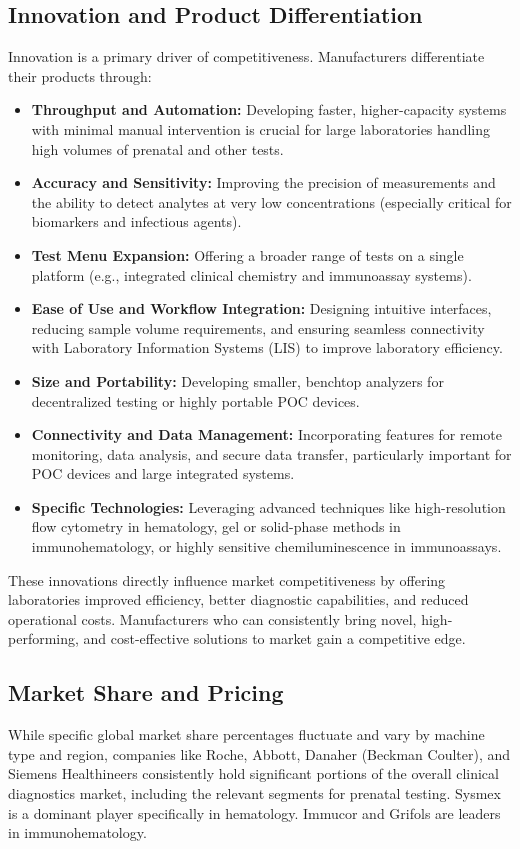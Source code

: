 \documentclass{article}
\begin{document}
\subsection{Innovation and Product Differentiation}
Innovation is a primary driver of competitiveness. Manufacturers differentiate their products through:
\begin{itemize}
    \item \textbf{Throughput and Automation:} Developing faster, higher-capacity systems with minimal manual intervention is crucial for large laboratories handling high volumes of prenatal and other tests.
    \item \textbf{Accuracy and Sensitivity:} Improving the precision of measurements and the ability to detect analytes at very low concentrations (especially critical for biomarkers and infectious agents).
    \item \textbf{Test Menu Expansion:} Offering a broader range of tests on a single platform (e.g., integrated clinical chemistry and immunoassay systems).
    \item \textbf{Ease of Use and Workflow Integration:} Designing intuitive interfaces, reducing sample volume requirements, and ensuring seamless connectivity with Laboratory Information Systems (LIS) to improve laboratory efficiency.
    \item \textbf{Size and Portability:} Developing smaller, benchtop analyzers for decentralized testing or highly portable POC devices.
    \item \textbf{Connectivity and Data Management:} Incorporating features for remote monitoring, data analysis, and secure data transfer, particularly important for POC devices and large integrated systems.
    \item \textbf{Specific Technologies:} Leveraging advanced techniques like high-resolution flow cytometry in hematology, gel or solid-phase methods in immunohematology, or highly sensitive chemiluminescence in immunoassays.
\end{itemize}
These innovations directly influence market competitiveness by offering laboratories improved efficiency, better diagnostic capabilities, and reduced operational costs. Manufacturers who can consistently bring novel, high-performing, and cost-effective solutions to market gain a competitive edge.

\subsection{Market Share and Pricing}
While specific global market share percentages fluctuate and vary by machine type and region, companies like Roche, Abbott, Danaher (Beckman Coulter), and Siemens Healthineers consistently hold significant portions of the overall clinical diagnostics market, including the relevant segments for prenatal testing. Sysmex is a dominant player specifically in hematology. Immucor and Grifols are leaders in immunohematology.
\end{document}
